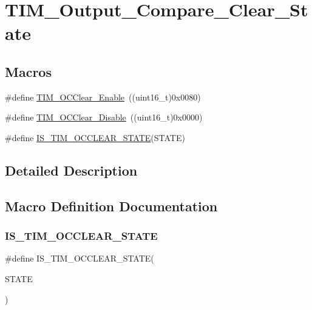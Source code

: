 \hypertarget{group___t_i_m___output___compare___clear___state}{}\section{T\+I\+M\+\_\+\+Output\+\_\+\+Compare\+\_\+\+Clear\+\_\+\+State}
\label{group___t_i_m___output___compare___clear___state}
\subsection*{Macros}
\begin{DoxyCompactItemize}
\item 
\#define \mbox{\hyperlink{group___t_i_m___output___compare___clear___state_ga1b7bce48b3e1478aad98c95fbbe7a6e0}{T\+I\+M\+\_\+\+O\+C\+Clear\+\_\+\+Enable}}~((uint16\+\_\+t)0x0080)
\item 
\#define \mbox{\hyperlink{group___t_i_m___output___compare___clear___state_gadb09946cb5dded7520baf4b19173204d}{T\+I\+M\+\_\+\+O\+C\+Clear\+\_\+\+Disable}}~((uint16\+\_\+t)0x0000)
\item 
\#define \mbox{\hyperlink{group___t_i_m___output___compare___clear___state_ga5297586b42da9263ac4f767c83202fed}{I\+S\+\_\+\+T\+I\+M\+\_\+\+O\+C\+C\+L\+E\+A\+R\+\_\+\+S\+T\+A\+TE}}(S\+T\+A\+TE)
\end{DoxyCompactItemize}


\subsection{Detailed Description}


\subsection{Macro Definition Documentation}
\mbox{\label{group___t_i_m___output___compare___clear___state_ga5297586b42da9263ac4f767c83202fed}} 
\subsubsection{\texorpdfstring{IS\_TIM\_OCCLEAR\_STATE}{IS\_TIM\_OCCLEAR\_STATE}}
{\footnotesize\ttfamily \#define I\+S\+\_\+\+T\+I\+M\+\_\+\+O\+C\+C\+L\+E\+A\+R\+\_\+\+S\+T\+A\+TE(\begin{DoxyParamCaption}\item[{}]{S\+T\+A\+TE }\end{DoxyParamCaption})}

